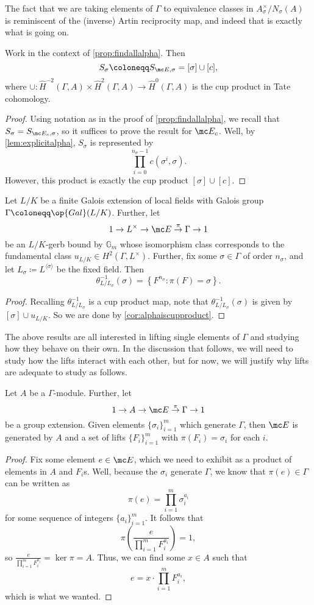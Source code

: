 \documentclass{article}
\numberwithin{equation}{section}
\begin{document}
The fact that we are taking elements of $\Gamma$ to equivalence classes in $A_\sigma^\times/N_\sigma\left(A\right)$ is reminiscent of the (inverse) Artin reciprocity map, and indeed that is exactly what is going on.
\begin{cor} \label{cor:alphaiscupproduct}
	Work in the context of \autoref{prop:findallalpha}. Then
	\[S_\sigma\coloneqq S_{\mc E,\sigma}=[\sigma]\cup[c],\]
	where $\cup\colon\widehat H^{-2}(\Gamma,A)\times\widehat H^2(\Gamma,A)\to\widehat H^0(\Gamma,A)$ is the cup product in Tate cohomology.
\end{cor}
\begin{proof}
	Using notation as in the proof of \autoref{prop:findallalpha}, we recall that $S_\sigma=S_{\mc E_c,\sigma}$, so it suffices to prove the result for $\mc E_c$. Well, by \autoref{lem:explicitalpha}, $S_\sigma$ is represented by
	\[\prod_{i=0}^{n_\sigma-1}c\left(\sigma^i,\sigma\right).\]
	However, this product is exactly the cup product $[\sigma]\cup[c]$.
\end{proof}
\begin{cor}
	Let $L/K$ be a finite Galois extension of local fields with Galois group $\Gamma\coloneqq\op{Gal}(L/K)$. Further, let
	\[1\to L^\times\to\mc E\stackrel\pi\to\Gamma\to1\]
	be an $L/K$-gerb bound by $\mathbb G_m$ whose isomorphism class corresponds to the fundamental class $u_{L/K}\in H^2(\Gamma,L^\times)$. Further, fix some $\sigma\in\Gamma$ of order $n_\sigma$, and let $L_\sigma\coloneqq L^{\langle\sigma\rangle}$ be the fixed field. Then
	\[\theta_{L/L_\sigma}^{-1}(\sigma)=\left\{F^{n_\sigma}:\pi(F)=\sigma\right\}.\]
\end{cor}
\begin{proof}
	Recalling $\theta_{L/L_\sigma}^{-1}$ is a cup product map, note that $\theta_{L/L_\sigma}^{-1}(\sigma)$ is given by $[\sigma]\cup u_{L/K}$. So we are done by \autoref{cor:alphaiscupproduct}.
\end{proof}
The above results are all interested in lifting single elements of $\Gamma$ and studying how they behave on their own. In the discussion that follows, we will need to study how the lifts interact with each other, but for now, we will justify why lifts are adequate to study as follows.
\begin{proposition} \label{prop:liftsgenerate}
	Let $A$ be a $\Gamma$-module. Further, let
	\[1\to A\to\mc E\stackrel\pi\to\Gamma\to1\]
	be a group extension. Given elements $\{\sigma_i\}_{i=1}^m$ which generate $\Gamma$, then $\mc E$ is generated by $A$ and a set of lifts $\{F_i\}_{i=1}^m$ with $\pi(F_i)=\sigma_i$ for each $i$.
\end{proposition}
\begin{proof}
	Fix some element $e\in\mc E$, which we need to exhibit as a product of elements in $A$ and $F_i$s. Well, because the $\sigma_i$ generate $\Gamma$, we know that $\pi(e)\in\Gamma$ can be written as
	\[\pi(e)=\prod_{i=1}^m\sigma_i^{a_i}\]
	for some sequence of integers $\{a_i\}_{i=1}^m$. It follows that
	\[\pi\left(\frac e{\prod_{i=1}^mF_i^{a_i}}\right)=1,\]
	so $\frac e{\prod_{i=1}^mF_i^{a_i}}=\ker\pi=A$. Thus, we can find some $x\in A$ such that
	\[e=x\cdot\prod_{i=1}^mF_i^{a_i},\]
	which is what we wanted.
\end{proof}
\end{document}

